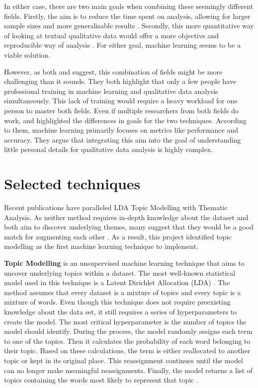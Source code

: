 \documentclass{l4proj}
\begin{document}
In either case, there are two main goals when combining these seemingly different fields. Firstly, the aim is to reduce the time spent on analysis, allowing for larger sample sizes and more generalisable results \cite{leopold2020opposites}. Secondly, this more quantitative way of looking at textual qualitative data would offer a more objective and reproducible way of analysis \citep{chen2018using}. For either goal, machine learning seems to be a viable solution.

However, as both \cite{chen2018using} and \cite{gauthier2022computational} suggest, this combination of fields might be more challenging than it sounds. They both highlight that only a few people have professional training in machine learning and qualitative data analysis simultaneously. This lack of training would require a heavy workload for one person to master both fields. Even if multiple researchers from both fields do work, \cite{chen2018using} and \cite{lewis2013content} highlighted the differences in goals for the two techniques. According to them, machine learning primarily focuses on metrics like performance and accuracy. They argue that integrating this aim into the goal of understanding little personal details for qualitative data analysis is highly complex.

\section{Selected techniques}
Recent publications have paralleled LDA Topic Modelling with Thematic Analysis. As neither method requires in-depth knowledge about the dataset and both aim to discover underlying themes, many suggest that they would be a good match for augmenting each other \citep{delgosha2022discovering, gauthier2022will, gonzalez2022using}. As a result, this project identified topic modelling as the first machine learning technique to implement.

\textbf{Topic Modelling} is an unsupervised machine learning technique that aims to uncover underlying topics within a dataset. The most well-known statistical model used in this technique is a Latent Dirichlet Allocation (LDA) \citep{blei2003latent}. The method assumes that every dataset is a mixture of topics and every topic is a mixture of words. Even though this technique does not require preexisting knowledge about the data set, it still requires a series of hyperparameters to create the model. The most critical hyperparameter is the number of topics the model should identify. During the process, the model randomly assigns each term to one of the topics. Then it calculates the probability of each word belonging to their topic. Based on these calculations, the term is either reallocated to another topic or kept in its original place. This reassignment continues until the model can no longer make meaningful reassignments. Finally, the model returns a list of topics containing the words most likely to represent that topic \citep{asmussen2019smart, blei2003latent, vayansky2020review}.
\end{document}
